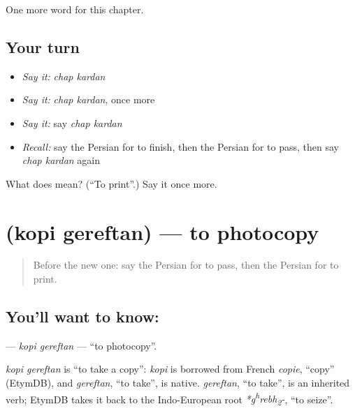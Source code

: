 \begin{grammarlens}[title={What you've built}]
One more word for this chapter.
\end{grammarlens}

\subsection*{Your turn}
\begin{itemize}
\raggedright
  \item \emph{Say it:} \emph{chap kardan}
  \item \emph{Say it:} \emph{chap kardan}, once more
  \item \emph{Say it:} say \emph{chap kardan}
  \item \emph{Recall:} say the Persian for to finish, then the Persian for to pass, then say \emph{chap kardan} again
\end{itemize}

\begin{tcolorbox}[breakable,colback=teal!4,colframe=teal!35!black,title={Before you move on}]
What does   mean? (\textquotedblleft{}To print\textquotedblright{}.) Say it once more.
\end{tcolorbox}
\section[\texorpdfstring{\fa{کپی} \fa{گرفتن} (kopi gereftan)}{کپی گرفتن (kopi gereftan)}]{  (kopi gereftan) — to photocopy}

\label{lesson:FA-C220-kopi-gereftan}



\begin{quote}
Before the new one: say the Persian for to pass, then the Persian for to print.
\end{quote}

\subsection*{You'll want to know:  }
\textbf{ } — \emph{kopi gereftan} — \textquotedblleft{}to photocopy\textquotedblright{}.

\begin{cousinweb}
\emph{kopi gereftan} is \textquotedblleft{}to take a copy\textquotedblright{}: \emph{kopi} is borrowed from French \emph{copie}, \textquotedblleft{}copy\textquotedblright{} (EtymDB), and \emph{gereftan}, \textquotedblleft{}to take\textquotedblright{}, is native. \emph{gereftan}, \textquotedblleft{}to take\textquotedblright{}, is an inherited verb; EtymDB takes it back to the Indo-European root \emph{*g\textsuperscript{h}rebh\textsubscript{2}-}, \textquotedblleft{}to seize\textquotedblright{}.
\end{cousinweb}

